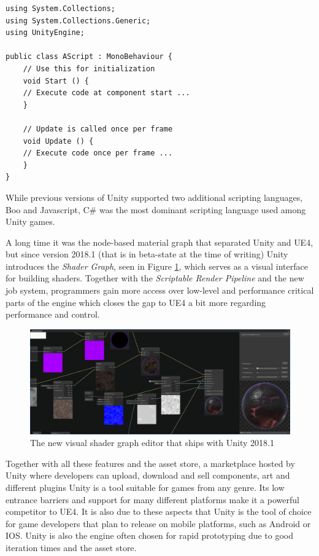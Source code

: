 \clearpage

\begin{lstlisting}[language={[Sharp]C}, frame=single, caption={Example of an empty C\# script in Unity}, label={Script}]
using System.Collections;
using System.Collections.Generic;
using UnityEngine;

public class AScript : MonoBehaviour {
	// Use this for initialization
	void Start () {
	// Execute code at component start ...
	}
	
	// Update is called once per frame
	void Update () {
	// Execute code once per frame ...
	}
}
\end{lstlisting}

While previous versions of Unity supported two additional scripting languages, Boo and Javascript, C\# was the most dominant scripting language used among Unity games. 

A long time it was the node-based material graph that separated Unity and \ac{UE4}, but since version 2018.1 (that is in beta-state at the time of writing) Unity introduces the \textit{Shader Graph}, seen in Figure \ref{fig:unity_shader_graph}, which serves as a visual interface for building shaders. Together with the \textit{Scriptable Render Pipeline} and the new job system, programmers gain more access over low-level and performance critical parts of the engine which closes the gap to \ac{UE4} a bit more regarding performance and control.

\begin{figure}[h!]
	\includegraphics[width=\linewidth]{PICs/unity_shader_graph.png}
	\caption{The new visual shader graph editor that ships with Unity 2018.1}
	\label{fig:unity_shader_graph}
\end{figure}

Together with all these features and the asset store, a marketplace hosted by Unity where developers can upload, download and sell components, art and different plugins Unity is a tool suitable for games from any genre. Its low entrance barriers and support for many different platforms make it a powerful competitor to \ac{UE4}. It is also due to these aspects that Unity is the tool of choice for game developers that plan to release on mobile platforms, such as Android or IOS. Unity is also the engine often chosen for rapid prototyping due to good iteration times and the asset store.


